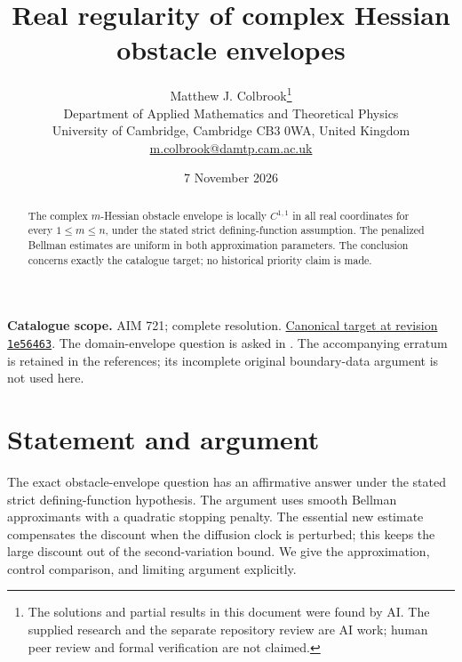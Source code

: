 \documentclass[11pt,a4paper]{article}
\theoremstyle{remark}
\begin{document}
\title{Real regularity of complex Hessian obstacle envelopes}
\author{Matthew J. Colbrook\thanks{The solutions and partial results in this document were found by AI. The supplied research and the separate repository review are AI work; human peer review and formal verification are not claimed.}\\[4pt]
\small Department of Applied Mathematics and Theoretical Physics\\
\small University of Cambridge, Cambridge CB3 0WA, United Kingdom\\
\small\href{mailto:m.colbrook@damtp.cam.ac.uk}{m.colbrook@damtp.cam.ac.uk}}
\date{7 November 2026}
\maketitle
\begin{abstract}
The complex $m$-Hessian obstacle envelope is locally $C^{1,1}$ in all real coordinates for every $1\le m\le n$, under the stated strict defining-function assumption. The penalized Bellman estimates are uniform in both approximation parameters. The conclusion concerns exactly the catalogue target; no historical priority claim is made.
\end{abstract}
\noindent\textbf{Catalogue scope.} AIM 721; complete resolution. \href{https://github.com/MColbrook/AIM/blob/1e564633494c109edfd3ec46da1366adcff925a5/problems/721-real-c1-1-regularity-of-complex-hessian-obstacle-envelopes.md}{Canonical target at revision \texttt{1e56463}}.
The domain-envelope question is asked in \cite[p.~998]{BenaliZeriahi}. The accompanying erratum \cite{BenaliErratum} is retained in the references; its incomplete original boundary-data argument is not used here.

\section{Statement and argument}
\label{sec:721}

The exact obstacle-envelope question has an affirmative answer under the
stated strict defining-function hypothesis.  The argument uses smooth Bellman
approximants with a quadratic stopping penalty.  The essential new estimate
compensates the discount when the diffusion clock is perturbed; this keeps the
large discount out of the second-variation bound.  We give the approximation,
control comparison, and limiting argument explicitly.
\end{document}
